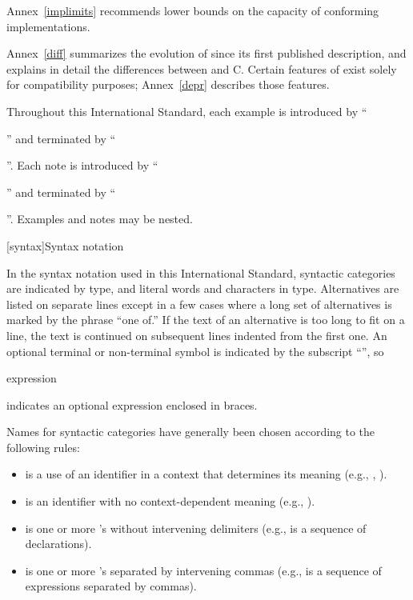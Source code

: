 \pnum
Annex~\ref{implimits} recommends lower bounds on the capacity of conforming
implementations.

\pnum
Annex~\ref{diff} summarizes the evolution of \Cpp  since its first
published description, and explains in detail the differences between
\Cpp  and C\@. Certain features of \Cpp  exist solely for compatibility
purposes; Annex~\ref{depr} describes those features.

\pnum
Throughout this International Standard, each example is introduced by
``\begin{example}'' and terminated by ``\end{example}''. Each note is
introduced by ``\begin{note}'' and terminated by ``\end{note}''. Examples
and notes may be nested.%

[syntax]{Syntax notation}

\pnum
{}%
In the syntax notation used in this International Standard, syntactic
categories are indicated by  type, and literal words
and characters in   type. Alternatives are
listed on separate lines except in a few cases where a long set of
alternatives is marked by the phrase ``one of.'' If the text of an alternative is too long to fit on a line, the text is continued on subsequent lines indented from the first one.
An optional terminal or non-terminal symbol is indicated by the subscript
``\opt'', so

\begin{ncbnf}
\terminal{\{} expression\opt{} \terminal{\}}
\end{ncbnf}

indicates an optional expression enclosed in braces.%

\pnum
Names for syntactic categories have generally been chosen according to
the following rules:
\begin{itemize}
\item {} is a use of an identifier in a context that
determines its meaning (e.g., ,
).
\item {} is an identifier with no context-dependent meaning
(e.g., ).
\item {} is one or more 's without intervening
delimiters (e.g.,  is a sequence of
declarations).
\item {} is one or more 's separated by
intervening commas (e.g.,  is a sequence of
expressions separated by commas).
\end{itemize}%

